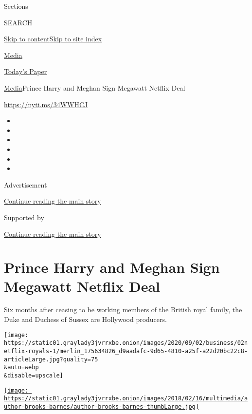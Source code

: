Sections

SEARCH

\protect\hyperlink{site-content}{Skip to
content}\protect\hyperlink{site-index}{Skip to site index}

\href{https://www.nytimes3xbfgragh.onion/section/business/media}{Media}

\href{https://myaccount.nytimes3xbfgragh.onion/auth/login?response_type=cookie\&client_id=vi}{}

\href{https://www.nytimes3xbfgragh.onion/section/todayspaper}{Today's
Paper}

\href{/section/business/media}{Media}\textbar{}Prince Harry and Meghan
Sign Megawatt Netflix Deal

\url{https://nyti.ms/34WWHCJ}

\begin{itemize}
\item
\item
\item
\item
\item
\item
\end{itemize}

Advertisement

\protect\hyperlink{after-top}{Continue reading the main story}

Supported by

\protect\hyperlink{after-sponsor}{Continue reading the main story}

\hypertarget{prince-harry-and-meghan-sign-megawatt-netflix-deal}{%
\section{Prince Harry and Meghan Sign Megawatt Netflix
Deal}\label{prince-harry-and-meghan-sign-megawatt-netflix-deal}}

Six months after ceasing to be working members of the British royal
family, the Duke and Duchess of Sussex are Hollywood producers.

\texttt{[image: https://static01.graylady3jvrrxbe.onion/images/2020/09/02/business/02netflix-royals-1/merlin\_175634826\_d9aadafc-9d65-4810-a25f-a22d20bc22c8-articleLarge.jpg?quality=75\\\&auto=webp\\\&disable=upscale]}

\href{https://www.nytimes3xbfgragh.onion/by/brooks-barnes}{\texttt{[image: https://static01.graylady3jvrrxbe.onion/images/2018/02/16/multimedia/author-brooks-barnes/author-brooks-barnes-thumbLarge.jpg]}}

